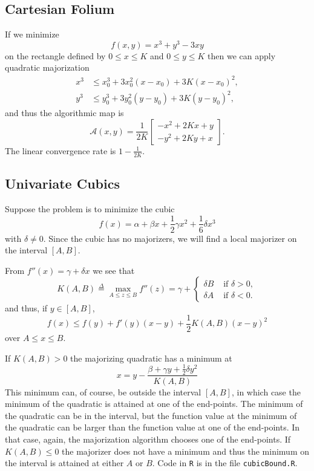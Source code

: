 \documentclass[
  12pt,
]{book}
\begin{document}
\hypertarget{cartesian-folium}{%
\subsection{Cartesian Folium}\label{cartesian-folium}}

If we minimize
\[
f(x,y)=x^3+y^3-3xy
\]
on the rectangle defined by \(0\leq x\leq K\)
and \(0\leq y\leq K\) then we can apply quadratic majorization
\begin{align*}
x^3&\leq x_0^3+3x_0^2(x-x_0)+3K(x-x_0)^2,\\
y^3&\leq y_0^3+3y_0^2(y-y_0)+3K(y-y_0)^2,
\end{align*}
and thus the algorithmic map is
\[
\mathcal{A}(x,y)=\frac{1}{2K}\begin{bmatrix}-x^2+2Kx+y\\-y^2+2Ky+x\end{bmatrix}.
\]
The linear convergence rate is \(1-\frac{1}{2K}\).

\hypertarget{univariate-cubics}{%
\subsection{Univariate Cubics}\label{univariate-cubics}}

Suppose the problem is to minimize the cubic
\[
f(x)=\alpha+\beta x+\frac12\gamma x^2+\frac16\delta x^3
\]
with \(\delta\not= 0\). Since the cubic has no majorizers, we will find a local majorizer on the interval \([A,B]\).

From \(f''(x)=\gamma+\delta x\)
we see that
\[
K(A,B)\mathop{=}\limits^{\Delta}\max_{A\leq z\leq B} f''(z)=\gamma+\begin{cases}\delta B&\text{ if }\delta>0,\\
\delta A&\text{ if }\delta<0.\end{cases}
\]
and thus, if \(y\in[A,B]\),
\[
f(x)\leq f(y)+f'(y)(x-y)+\frac12 K(A,B)(x-y)^2
\]
over \(A\leq x\leq B\).

If \(K(A,B)>0\) the majorizing quadratic has a minimum at
\[
x=y-\frac{\beta+\gamma y+\frac12\delta y^2}{K(A,B)}
\]
This minimum can, of course, be outside the interval \([A,B]\), in which case the minimum of the quadratic is attained at one of the end-points. The minimum of the quadratic can be in the interval, but the function value at the minimum of the quadratic can be larger than the function value at one of the end-points. In that case, again, the majorization algorithm chooses one of the end-points. If \(K(A,B)\leq 0\) the majorizer does not have a minimum
and thus the minimum on the interval is attained at either \(A\) or \(B\). Code in \texttt{R} is in the file \texttt{cubicBound.R}.
\end{document}
